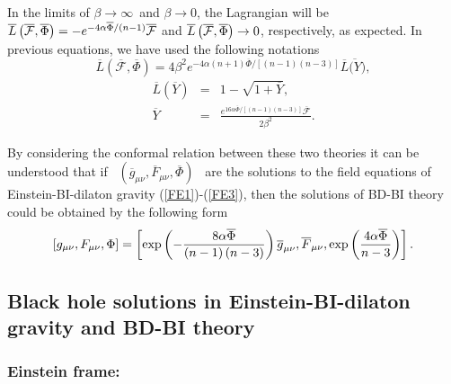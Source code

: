 \documentclass[aps,onecolumn ]{revtex4}
\begin{document}
In the limits of $\beta \rightarrow \infty $\ and $\beta \rightarrow 0$, the
Lagrangian will be $\overline{L}\left( \overline{\mathcal{F}},\overline{\Phi
}\right) =-e^{-4\alpha \overline{\Phi }/\left( n-1\right) }\overline{%
\mathcal{F}}\ $and$\ \overline{L}\left( \overline{\mathcal{F}},\overline{%
\Phi }\right) \rightarrow 0$, respectively, as expected. In
previous equations, we have used the following notations
\begin{equation}
\overline{L}\left( \overline{\mathcal{F}},\overline{\Phi }\right) =4\beta
^{2}e^{-4\alpha \left( n+1\right) \overline{\Phi }/\left[ \left( n-1\right)
\left( n-3\right) \right] }\overline{L}\overline{(Y}),  \label{LFP2}
\end{equation}%
\begin{eqnarray}
\overline{L}\left( \overline{Y}\right) &=&1-\sqrt{1+\overline{Y}},
\label{L(Y)} \\
\overline{Y} &=&\frac{e^{16\alpha \overline{\Phi }/\left[ \left( n-1\right)
\left( n-3\right) \right] }\overline{\mathcal{F}}}{2\beta ^{2}}.  \label{Y}
\end{eqnarray}

By considering the conformal relation between these two theories it can be
understood that if \ $\left( \overline{g}_{\mu \nu },\overline{F}_{\mu \nu },%
\overline{\Phi }\right) $ \ are the solutions to the field equations of
Einstein-BI-dilaton gravity (\ref{FE1})-(\ref{FE3}), then the solutions of
BD-BI theory could be obtained by the following form
\begin{equation}
\left[ g_{\mu \nu },F_{\mu \nu },\Phi \right] =\left[ \exp \left( -\frac{%
8\alpha \overline{\Phi }}{\left( n-1\right) (n-3)}\right) \overline{g}_{\mu
\nu },\overline{F}_{\mu \nu },\exp \left( \frac{4\alpha \overline{\Phi }}{n-3%
}\right) \right] .  \label{BDsol}
\end{equation}

\subsection{Black hole solutions in Einstein-BI-dilaton gravity and BD-BI
theory \label{Sol}}

\subsubsection{\textbf{Einstein frame:}}
\end{document}
